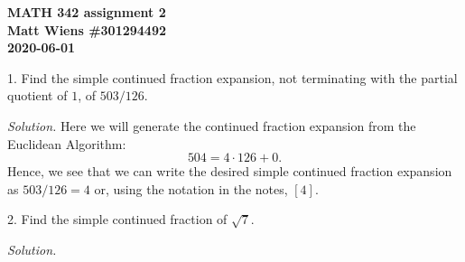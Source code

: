 \documentclass{article}
\begin{document}
\textbf{MATH 342 assignment 2} \\
\textbf{Matt Wiens \#301294492} \\
\textbf{2020-06-01}

1. Find the simple continued fraction expansion, not terminating with
   the partial quotient of $1$, of $503/126$.

\textit{Solution.}
Here we will generate the continued fraction expansion from the
Euclidean Algorithm:
%
\begin{equation*}
    504 = 4 \cdot 126 + 0
    .
\end{equation*}
%
Hence, we see that we can write the desired simple continued fraction
expansion as $503 / 126 = 4$ or, using the notation in the notes, $[4]$.

\newpage

2. Find the simple continued fraction of $\sqrt{7}$.

\textit{Solution.}
\end{document}
